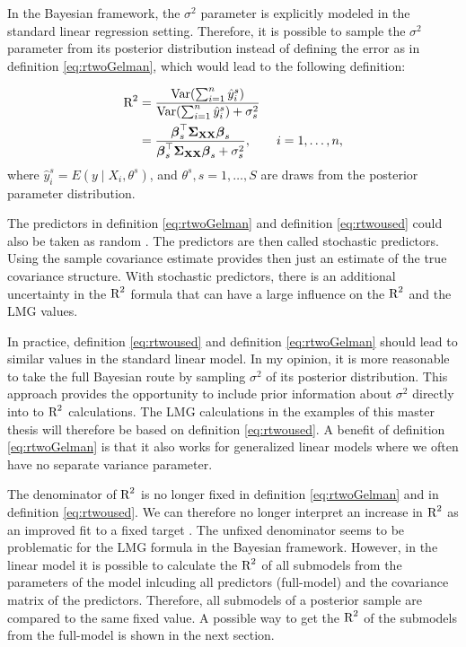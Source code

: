 \documentclass[11pt,a4paper,twoside]{book}\usepackage[]{graphicx}\usepackage[]{color}
\begin{document}
In the Bayesian framework, the $\sigma^2$ parameter is explicitly modeled in the standard linear regression setting. Therefore, it is possible to sample the $\sigma^2$ parameter from its posterior distribution instead of defining the error as in definition \eqref{eq:rtwoGelman}, which would lead to the following definition:

    \begin{align} 
        \text{R}^2 &= \frac{\operatorname{Var}(\sum_{i=1}^{n}\hat{y}^s_{i})}{\operatorname{Var}(\sum_{i=1}^{n}\hat{y}^s_{i})+\sigma_{s}^2} \nonumber \\ &= \frac{{\boldsymbol{\beta}}_{s}^\top {\boldsymbol{\Sigma}}{}_{{\mathbf{X}} {\mathbf{X}}}  {\boldsymbol{\beta}}_{s}}{{\boldsymbol{\beta}}_{s}^\top {\boldsymbol{\Sigma}}{}_{{\mathbf{X}} {\mathbf{X}}}  {\boldsymbol{\beta}}_{s}+\sigma_{s}^2}, \qquad i = 1,\dots,n, \label{eq:rtwoused} 
   \end{align} 
where $\hat{y}^s_{i}  = E \left({y \mid X_{i}, \theta^s}\right) $,  and $\theta^s, s = 1,\dotsc, S$ are draws from the posterior parameter distribution.


The predictors in definition \eqref{eq:rtwoGelman} and definition \eqref{eq:rtwoused} could also be taken as random \citep{Gelman2017}. The predictors are then called stochastic predictors. Using the sample covariance estimate provides then just an estimate of the true covariance structure. With stochastic predictors, there is an additional uncertainty in the $\text{R}^2$ formula that can have a large influence on the $\text{R}^2$ and the LMG values.

In practice, definition \eqref{eq:rtwoused} and definition \eqref{eq:rtwoGelman} should lead to  similar values in the standard linear model. In my opinion, it is more reasonable to take the full Bayesian route by sampling  $\sigma^2$ of its posterior distribution. This approach provides the opportunity to include prior information about $\sigma^2$ directly into to $\text{R}^2$ calculations. The LMG calculations in the examples of this master thesis will therefore be based on definition \eqref{eq:rtwoused}.  A benefit of definition \eqref{eq:rtwoGelman} is that it also works for generalized linear models where we often have no separate variance parameter.

The denominator of $\text{R}^2$ is no longer fixed in definition \eqref{eq:rtwoGelman} and in definition \eqref{eq:rtwoused}. We can therefore no longer interpret an increase in $\text{R}^2$ as an improved fit to a fixed target \citep{Gelman2017}. The unfixed denominator seems to be problematic for the LMG formula in the Bayesian framework. However, in the linear model it is possible to calculate the $\text{R}^2$ of all submodels from the parameters of the model inlcuding all predictors (full-model) and the covariance matrix of the predictors. Therefore,  all submodels of a posterior sample are compared to the same fixed value. A possible way to get the $\text{R}^2$ of the submodels from the full-model is shown in the next section.
\end{document}
